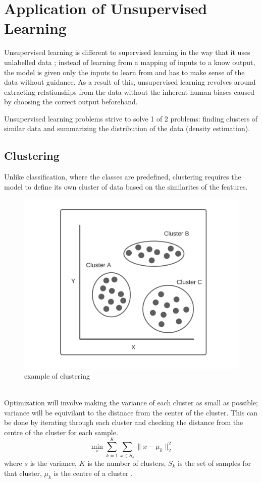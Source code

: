 \documentclass[10pt,a4paper]{report}
\begin{document}
			\section{Application of Unsupervised Learning}
			Unsupervised learning is different to supervised learning in the way that it uses unlabelled data \autocite[p. 105]{DeepLearning}; instead
			of learning from a mapping of inputs to a know output, the model is given only the inputs to learn from and has to make sense of the data without guidance.
			As a result of this, unsupervised learning revolves around extracting relationships from the data without the inherent human biases caused by choosing the correct output beforehand. \par
			Unsupervised learning problems strive to solve 1 of 2 problems: finding clusters of similar data and summarizing the distribution of the data
			(density estimation).

				\subsection{Clustering}
					Unlike classification, where the classes are predefined, clustering requires the model to define its own cluster of data
					based on the similarites of the features.
					\begin{figure}[h]
						\centering
						\includegraphics[scale=0.7]{clustering-diagram.png}
						\caption{example of clustering}
						\label{fig:clustering}
					\end{figure} \\
					Optimization will involve making the variance of each cluster as small as possible; variance will
					be equivilant to the distnace from the center of the cluster. This can be done by iterating through each cluster
					and checking the distance from the centre of the cluster for each sample.
					\begin{equation}
						\min_s \sum_{k=1}^{K} \sum_{x\in S_k} \| x - \mu_k \|_{2}^{2}
						\label{eq:unsupervised-learning-clustering}
					\end{equation}
					where $s$ is the variance, $K$ is the number of clusters, $S_k$ is the set of samples for that cluster,
					$\mu_k$ is the centre of a cluster \autocite[p. 3-4]{SurveyOfOptimizationMethods}.
\end{document}

